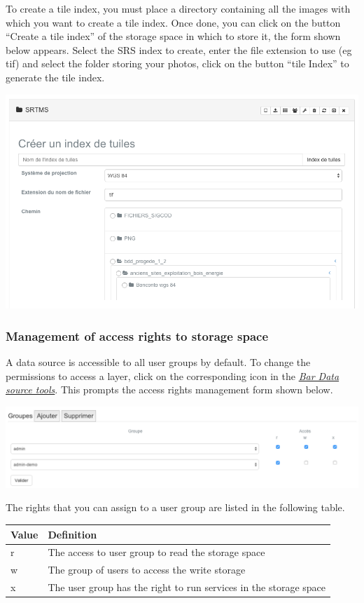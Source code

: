 \documentclass[letterpaper,10pt,english]{sphinxmanual}
\begin{document}
To create a tile index, you must place a directory containing all the images with which you want to create a tile index. Once done, you can click on the button ``Create a tile index'' of the storage space in which to store it, the form shown below appears. Select the SRS index to create, enter the file extension to use (eg tif) and select the folder storing your photos, click on the button ``tile Index'' to generate the tile index.

\includegraphics[width=1.000\linewidth]{data-tileindex.png}


\subsubsection{Management of access rights to storage space}
\label{data/datastores:gestion-des-droits-d-acces-d-un-espace-de-stockage}
A data source is accessible to all user groups by default. To change the permissions to access a layer, click on the corresponding icon in the {\hyperref[data/datasources:datasource-table-label]{\emph{Bar Data source tools}}}. This prompts the access rights management form shown below.

\includegraphics[width=1.000\linewidth]{data-privileges.png}

The rights that you can assign to a user group are listed in the following table.

\begin{tabulary}{\linewidth}{|L|L|}
\hline

\textbf{Value}
 & 
\textbf{Definition}
\\
\hline
r
 & 
The access to user group to read the storage space
\\
\hline
w
 & 
The group of users to access the write storage
\\
\hline
x
 & 
The user group has the right to run services in the storage space
\\
\hline\end{tabulary}
\end{document}
